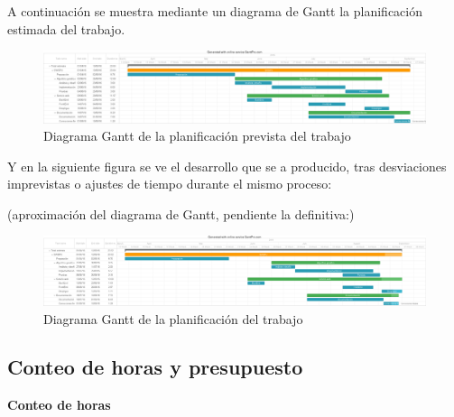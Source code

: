 A continuación se muestra mediante un diagrama de Gantt la planificación estimada del trabajo.

\bigskip
\begin{figure}[h]
	\centering
	\includegraphics[width=1.0\linewidth]{../images/gantt_prevista}
	\caption[Diagrama Gantt de la planificación prevista del trabajo]{Diagrama Gantt de la planificación prevista del trabajo}
	\label{fig:gantt_previsto}
\end{figure}

\bigskip
Y en la siguiente figura se ve el desarrollo que se a producido, tras desviaciones imprevistas o ajustes de tiempo durante el mismo proceso:


(aproximación del diagrama de Gantt, pendiente la definitiva:)


\bigskip
\begin{figure}[h]
	\centering
	\includegraphics[width=1.0\linewidth]{../images/gantt}
	\caption[Diagrama Gantt de la planificación del trabajo]{Diagrama Gantt de la planificación del trabajo}
	\label{fig:gantt}
\end{figure}


\bigskip
\subsection{Conteo de horas y presupuesto}
\bigskip

\textbf{Conteo de horas}


